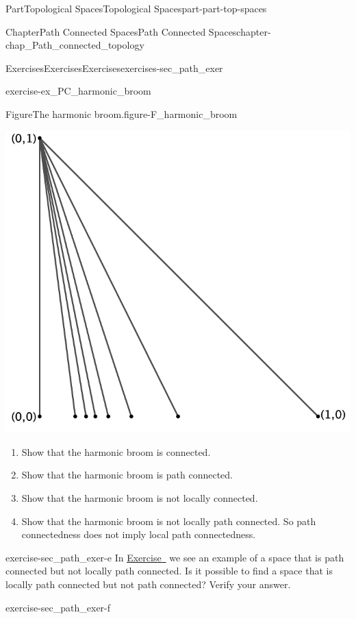 \documentclass[oneside,10pt,]{book}
\newcommand{\xreffont}{\relax}
\numberwithin{equation}{chapter}
\begin{document}
\begin{partptx}{Part}{Topological Spaces}{}{Topological Spaces}{}{}{part-part-top-spaces}
\begin{chapterptx}{Chapter}{Path Connected Spaces}{}{Path Connected Spaces}{}{}{chapter-chap_Path_connected_topology}
\begin{exercises-section}{Exercises}{Exercises}{}{Exercises}{}{}{exercises-sec_path_exer}
\begin{divisionexercise}{4}{}{}{exercise-ex_PC_harmonic_broom}
\begin{figureptx}{Figure}{The harmonic broom.}{figure-F_harmonic_broom}{}
\begin{image}{0.25}{0.5}{0.25}{}%
\includegraphics[width=\linewidth]{external/Harmonic_broom.pdf}
\end{image}%
\tcblower
\end{figureptx}%
\begin{enumerate}[font=\bfseries,label=(\alph*),ref=\alph*]%
\item{}Show that the harmonic broom is connected.%
\item{}Show that the harmonic broom is path connected.%
\item{}Show that the harmonic broom is not locally connected.%
\item{}Show that the harmonic broom is not locally path connected. So path connectedness does not imply local path connectedness.%
\end{enumerate}%
\end{divisionexercise}%
\begin{divisionexercise}{5}{}{}{exercise-sec_path_exer-e}%
In \hyperlink{exercise-ex_PC_harmonic_broom}{Exercise~{\xreffont 4}} we see an example of a space that is path connected but not locally path connected. Is it possible to find a space that is locally path connected but not path connected? Verify your answer.%
\end{divisionexercise}%
\begin{divisionexercise}{6}{}{}{exercise-sec_path_exer-f}%

\end{divisionexercise}
\end{exercises-section}
\end{chapterptx}
\end{partptx}
\end{document}

